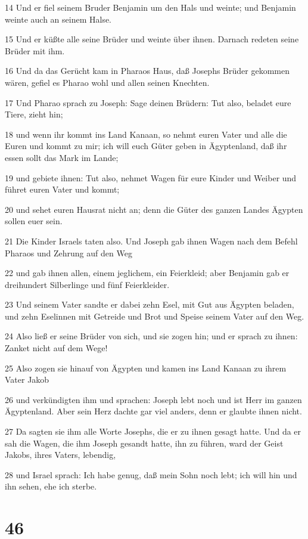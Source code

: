 \par 14 Und er fiel seinem Bruder Benjamin um den Hals und weinte; und Benjamin weinte auch an seinem Halse.
\par 15 Und er küßte alle seine Brüder und weinte über ihnen. Darnach redeten seine Brüder mit ihm.
\par 16 Und da das Gerücht kam in Pharaos Haus, daß Josephs Brüder gekommen wären, gefiel es Pharao wohl und allen seinen Knechten.
\par 17 Und Pharao sprach zu Joseph: Sage deinen Brüdern: Tut also, beladet eure Tiere, zieht hin;
\par 18 und wenn ihr kommt ins Land Kanaan, so nehmt euren Vater und alle die Euren und kommt zu mir; ich will euch Güter geben in Ägyptenland, daß ihr essen sollt das Mark im Lande;
\par 19 und gebiete ihnen: Tut also, nehmet Wagen für eure Kinder und Weiber und führet euren Vater und kommt;
\par 20 und sehet euren Hausrat nicht an; denn die Güter des ganzen Landes Ägypten sollen euer sein.
\par 21 Die Kinder Israels taten also. Und Joseph gab ihnen Wagen nach dem Befehl Pharaos und Zehrung auf den Weg
\par 22 und gab ihnen allen, einem jeglichem, ein Feierkleid; aber Benjamin gab er dreihundert Silberlinge und fünf Feierkleider.
\par 23 Und seinem Vater sandte er dabei zehn Esel, mit Gut aus Ägypten beladen, und zehn Eselinnen mit Getreide und Brot und Speise seinem Vater auf den Weg.
\par 24 Also ließ er seine Brüder von sich, und sie zogen hin; und er sprach zu ihnen: Zanket nicht auf dem Wege!
\par 25 Also zogen sie hinauf von Ägypten und kamen ins Land Kanaan zu ihrem Vater Jakob
\par 26 und verkündigten ihm und sprachen: Joseph lebt noch und ist Herr im ganzen Ägyptenland. Aber sein Herz dachte gar viel anders, denn er glaubte ihnen nicht.
\par 27 Da sagten sie ihm alle Worte Josephs, die er zu ihnen gesagt hatte. Und da er sah die Wagen, die ihm Joseph gesandt hatte, ihn zu führen, ward der Geist Jakobs, ihres Vaters, lebendig,
\par 28 und Israel sprach: Ich habe genug, daß mein Sohn noch lebt; ich will hin und ihn sehen, ehe ich sterbe.

\chapter{46}

